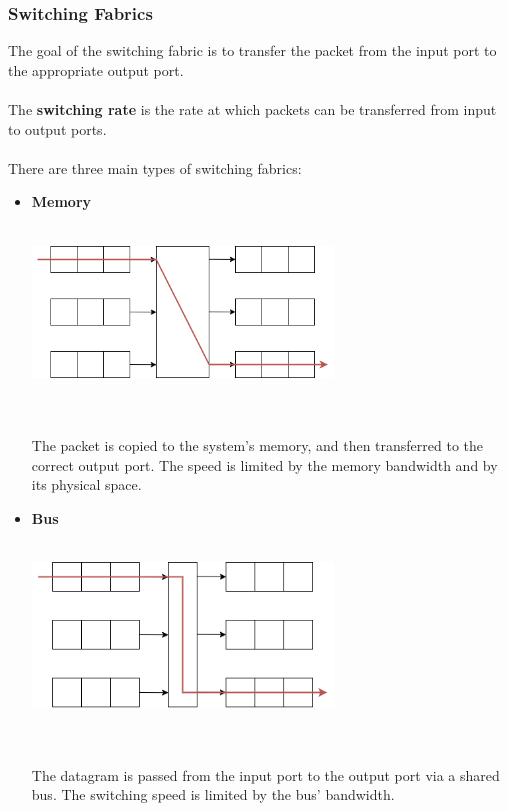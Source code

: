 \documentclass{article}
\begin{document}
\subsubsection{Switching Fabrics}
The goal of the switching fabric is to transfer the packet from the input port to the appropriate output port. \\ \\
The \textbf{switching rate} is the rate at which packets can be transferred from input to output ports. \\ \\
There are three main types of switching fabrics:

\begin{itemize}
	\item \textbf{Memory}
	\vspace{.2cm} \\ \\
	\centerline{\includegraphics[width=8cm]{./assets/memory.png}} \\ \\
	The packet is copied to the system's memory, and then transferred to the correct output port. The speed is limited by the memory bandwidth and by its physical space.
	
	\item \textbf{Bus}
	\vspace{.2cm} \\ \\
	\centerline{\includegraphics[width=8cm]{./assets/bus.png}} \\ \\
	The datagram is passed from the input port to the output port via a shared bus. The switching speed is limited by the bus' bandwidth.


\end{itemize}
\end{document}
